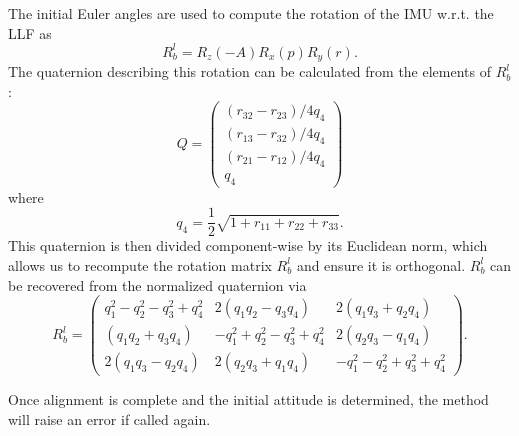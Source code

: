 \documentclass[11pt, oneside]{article}   	%
\begin{document}
The initial Euler angles are used to compute the rotation of the IMU w.r.t. the LLF as
\begin{equation}
R_b^l=R_z(-A)R_x(p)R_y(r).
\end{equation}
The quaternion describing this rotation can be calculated from the elements of $R_b^l$:\begin{equation}
Q=\begin{pmatrix}
(r_{32}-r_{23})/4q_4 \\
(r_{13}-r_{32})/4q_4 \\
(r_{21}-r_{12})/4q_4 \\
q_4
\end{pmatrix}
\end{equation}
where
\begin{equation}
q_4=\frac12\sqrt{1+r_{11}+r_{22}+r_{33}}.
\end{equation}
This quaternion is then divided component-wise by its Euclidean norm, which allows us to recompute the rotation matrix $R_b^l$ and ensure it is orthogonal.  $R_b^l$ can be recovered from the normalized quaternion via
\begin{equation}
R_b^l=\begin{pmatrix}
q_1^2-q_2^2-q_3^2+q_4^2 & 2(q_1q_2-q_3q_4) & 2(q_1q_3+q_2q_4) \\
(q_1q_2+q_3q_4) & -q_1^2+q_2^2-q_3^2+q_4^2 & 2(q_2q_3-q_1q_4) \\
2(q_1q_3-q_2q_4) &  2(q_2q_3+q_1q_4) & -q_1^2-q_2^2+q_3^2+q_4^2
\end{pmatrix}.
\end{equation}

Once alignment is complete and the initial attitude is determined, the  method will raise an error if called again.
\end{document}
